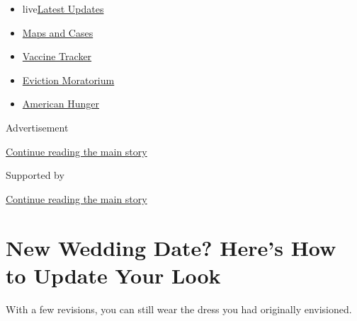 \begin{itemize}
\tightlist
\item
  live\href{https://www.nytimes3xbfgragh.onion/2020/09/09/world/covid-19-coronavirus.html?name=styln-coronavirus-national\&region=TOP_BANNER\&block=storyline_menu_recirc\&action=click\&pgtype=Article\&impression_id=9b415ff1-f280-11ea-9229-6716eea12c6f\&variant=undefined}{Latest
  Updates}
\item
  \href{https://www.nytimes3xbfgragh.onion/interactive/2020/us/coronavirus-us-cases.html?name=styln-coronavirus-national\&region=TOP_BANNER\&block=storyline_menu_recirc\&action=click\&pgtype=Article\&impression_id=9b415ff2-f280-11ea-9229-6716eea12c6f\&variant=undefined}{Maps
  and Cases}
\item
  \href{https://www.nytimes3xbfgragh.onion/interactive/2020/science/coronavirus-vaccine-tracker.html?name=styln-coronavirus-national\&region=TOP_BANNER\&block=storyline_menu_recirc\&action=click\&pgtype=Article\&impression_id=9b415ff3-f280-11ea-9229-6716eea12c6f\&variant=undefined}{Vaccine
  Tracker}
\item
  \href{https://www.nytimes3xbfgragh.onion/2020/09/02/your-money/eviction-moratorium-covid.html?name=styln-coronavirus-national\&region=TOP_BANNER\&block=storyline_menu_recirc\&action=click\&pgtype=Article\&impression_id=9b418700-f280-11ea-9229-6716eea12c6f\&variant=undefined}{Eviction
  Moratorium}
\item
  \href{https://www.nytimes3xbfgragh.onion/interactive/2020/09/02/magazine/food-insecurity-hunger-us.html?name=styln-coronavirus-national\&region=TOP_BANNER\&block=storyline_menu_recirc\&action=click\&pgtype=Article\&impression_id=9b418701-f280-11ea-9229-6716eea12c6f\&variant=undefined}{American
  Hunger}
\end{itemize}

Advertisement

\protect\hyperlink{after-top}{Continue reading the main story}

Supported by

\protect\hyperlink{after-sponsor}{Continue reading the main story}

\hypertarget{new-wedding-date-heres-how-to-update-your-look}{%
\section{New Wedding Date? Here's How to Update Your
Look}\label{new-wedding-date-heres-how-to-update-your-look}}

With a few revisions, you can still wear the dress you had originally
envisioned.

